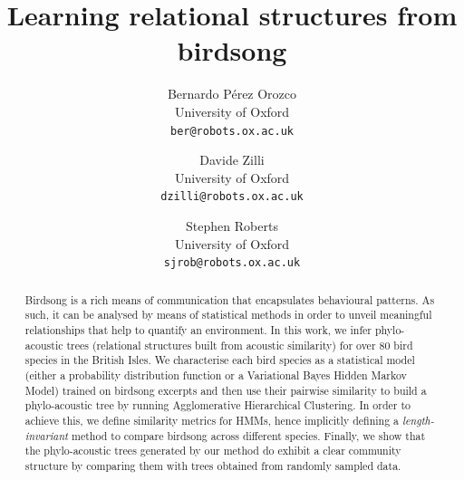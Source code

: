 \documentclass[pdftex,11pt,a4paper]{article}
\theoremstyle{definition}
\theoremstyle{remark}
\begin{document}
\title{Learning relational structures from birdsong}
\author{Bernardo P\'erez Orozco\\University of Oxford\\\texttt{ber@robots.ox.ac.uk} \and Davide Zilli \\University of Oxford\\\texttt{dzilli@robots.ox.ac.uk} \and Stephen Roberts\\University of Oxford\\\texttt{sjrob@robots.ox.ac.uk}}

\maketitle


\begin{abstract}
Birdsong is a rich means of communication that encapsulates behavioural patterns. As such, it can be analysed by means of statistical methods in order to unveil meaningful relationships that help to quantify an environment. In this work, we infer phylo-acoustic trees (relational structures built from acoustic similarity) for over 80 bird species in the British Isles. We characterise each bird species as a statistical model (either a probability distribution function or a Variational Bayes Hidden Markov Model) trained on birdsong excerpts and then use their pairwise similarity to build a phylo-acoustic tree by running Agglomerative Hierarchical Clustering. In order to achieve this, we define similarity metrics for HMMs, hence implicitly defining a \emph{length-invariant} method to compare birdsong across different species. Finally, we show that the phylo-acoustic trees generated by our method do exhibit a clear community structure by comparing them with trees obtained from randomly sampled data.
\end{abstract}
\end{document}
